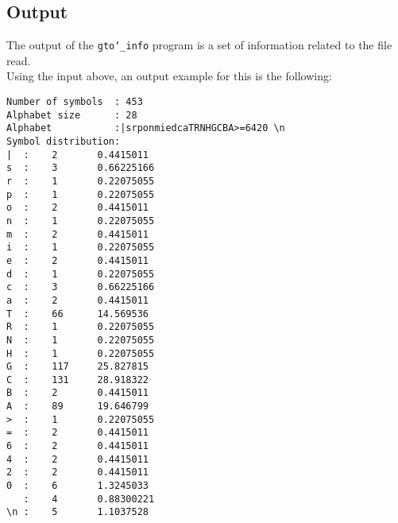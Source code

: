 \subsection*{Output}
The output of the \texttt{gto\char`_info} program is a set of information related to the file read. \\
Using the input above, an output example for this is the following:
\begin{lstlisting}
Number of symbols  : 453
Alphabet size      : 28
Alphabet           :|srponmiedcaTRNHGCBA>=6420 \n
Symbol distribution:
|  : 	2		0.4415011
s  : 	3		0.66225166
r  : 	1		0.22075055
p  : 	1		0.22075055
o  : 	2		0.4415011
n  : 	1		0.22075055
m  : 	2		0.4415011
i  : 	1		0.22075055
e  : 	2		0.4415011
d  : 	1		0.22075055
c  : 	3		0.66225166
a  : 	2		0.4415011
T  : 	66		14.569536
R  : 	1		0.22075055
N  : 	1		0.22075055
H  : 	1		0.22075055
G  : 	117		25.827815
C  : 	131		28.918322
B  : 	2		0.4415011
A  : 	89		19.646799
>  : 	1		0.22075055
=  : 	2		0.4415011
6  : 	2		0.4415011
4  : 	2		0.4415011
2  : 	2		0.4415011
0  : 	6		1.3245033
   : 	4		0.88300221
\n : 	5		1.1037528
\end{lstlisting}
